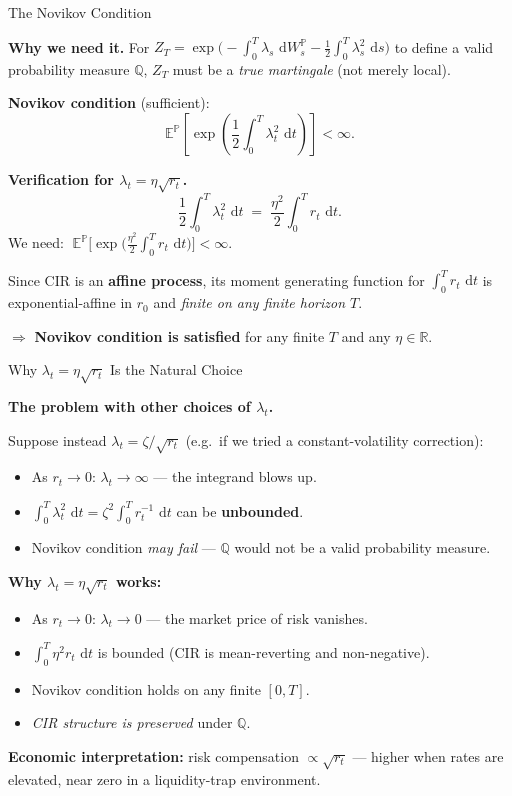 \documentclass[compress]{beamer}
\newcommand{\PP}{\mathbb{P}}
\newcommand{\QQ}{\mathbb{Q}}
\newcommand{\EE}{\mathbb{E}}
\newcommand{\dd}{\,\mathrm{d}}
\begin{document}
\begin{frame}{The Novikov Condition}

\textbf{Why we need it.}  For $Z_T = \exp\!\big(-\int_0^T \lambda_s\,\dd W_s^\PP - \frac{1}{2}\int_0^T \lambda_s^2\,\dd s\big)$ to define a valid probability measure $\QQ$, $Z_T$ must be a \textit{true martingale} (not merely local).

\medskip
\textbf{Novikov condition} (sufficient):
\[
	\EE^{\PP}\!\left[\exp\!\left(\frac{1}{2}\int_0^T \lambda_t^2\,\dd t\right)\right] < \infty.
\]

\medskip
\textbf{Verification for $\lambda_t = \eta\sqrt{r_t}$.}
\[
	\frac{1}{2}\int_0^T \lambda_t^2\,\dd t \;=\; \frac{\eta^2}{2}\int_0^T r_t\,\dd t.
\]
We need: $\;\EE^{\PP}\!\big[\exp\!\big(\tfrac{\eta^2}{2}\int_0^T r_t\,\dd t\big)\big] < \infty$.

\medskip
Since CIR is an \textbf{affine process}, its moment generating function for $\int_0^T r_t\,\dd t$ is exponential-affine in $r_0$ and \textit{finite on any finite horizon $T$}.

\medskip
$\Rightarrow$ \textbf{Novikov condition is satisfied} for any finite $T$ and any $\eta \in \mathbb{R}$.

\end{frame}

\begin{frame}{Why $\lambda_t = \eta\sqrt{r_t}$ Is the Natural Choice}

\textbf{The problem with other choices of $\lambda_t$.}

\medskip
Suppose instead $\lambda_t = \zeta / \sqrt{r_t}$ (e.g.\ if we tried a constant-volatility correction):
\begin{itemize}
	\item As $r_t \to 0$: $\lambda_t \to \infty$ — the integrand blows up.
	\item $\int_0^T \lambda_t^2\,\dd t = \zeta^2\int_0^T r_t^{-1}\,\dd t$ can be \textbf{unbounded}.
	\item Novikov condition \textit{may fail} — $\QQ$ would not be a valid probability measure.
\end{itemize}

\medskip
\textbf{Why $\lambda_t = \eta\sqrt{r_t}$ works:}
\begin{itemize}
	\item As $r_t \to 0$: $\lambda_t \to 0$ — the market price of risk vanishes.
	\item $\int_0^T \eta^2 r_t\,\dd t$ is bounded (CIR is mean-reverting and non-negative).
	\item Novikov condition holds on any finite $[0,T]$.
	\item \textit{CIR structure is preserved} under $\QQ$.
\end{itemize}

\medskip
\textbf{Economic interpretation:} risk compensation $\propto \sqrt{r_t}$ — higher when rates are elevated, near zero in a liquidity-trap environment.

\end{frame}
\end{document}
